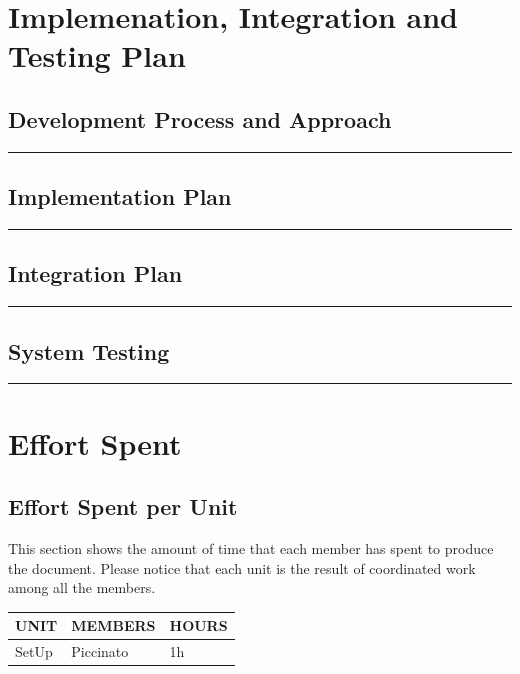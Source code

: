 \documentclass{Configuration_Files/Template}
\begin{document}
\chapter{Implemenation, Integration and Testing Plan}

\section{Development Process and Approach}

{\color{bluepoli}\rule{\linewidth}{0.1pt}}

\section{Implementation Plan}

{\color{bluepoli}\rule{\linewidth}{0.1pt}}

\section{Integration Plan}

{\color{bluepoli}\rule{\linewidth}{0.1pt}}

\section{System Testing}

{\color{bluepoli}\rule{\linewidth}{0.1pt}}

\chapter{Effort Spent}

\section{Effort Spent per Unit}

This section shows the amount of time that each member has spent to produce the document. Please notice that each unit is the result of coordinated work among all the members.

\begin{table}[h]
\centering
\begin{tabularx}{\textwidth}{| X | X | X |}
\hline
\textbf{UNIT} & \textbf{MEMBERS} & \textbf{HOURS} \\ [1ex]
\hline
SetUp & Piccinato & 1h \\ [1ex]
\hline
\end{tabularx}
\end{table}
\end{document}
